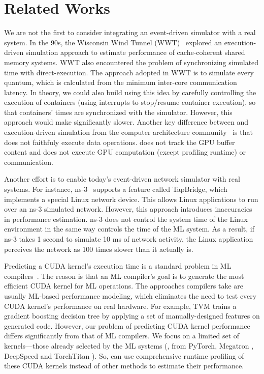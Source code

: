 \section{Related Works}

 We are not the first to consider integrating an event-driven simulator with a real system. In the 90s, the Wisconsin Wind Tunnel (WWT)~\cite{reinhardt1993wwt, mukherjee2000wwt} explored an execution-driven simulation approach to estimate performance of cache-coherent shared memory systems. WWT also encountered the problem of synchronizing simulated time with direct-execution. The approach adopted in WWT is to simulate every quantum, which is calculated from the minimum inter-core communication latency. In theory, we could also build \sys using this idea by carefully controlling the execution of containers (using interrupts to stop/resume container execution), so that containers' times are synchronized with the simulator. However, this approach would make \sys significantly slower. Another key difference between \sys and execution-driven simulation from the computer architecture community~\cite{martin2005gems} is that \sys does not faithfuly execute data operations. \sys does not track the GPU buffer content and does not execute GPU computation (except profiling runtime) or communication.

Another effort is to enable today's event-driven network simulator with real systems. For instance, ns-3~\cite{ns3} supports a feature called TapBridge, which implements a special Linux network device. This allows Linux applications to run over an ns-3 simulated network. However, this approach introduces inaccuracies in performance estimation. ns-3 does not control the system time of the Linux environment in the same way \sys controls the time of the ML system. As a result, if ns-3 takes 1 second to simulate 10 ms of network activity, the Linux application perceives the network as 100 times slower than it actually is. 

 Predicting a CUDA kernel's execution time is a standard problem in ML compilers~\cite{chen2018tvm, zheng2020ansor}. The reason is that an ML compiler's goal is to generate the most efficient CUDA kernel for ML operations.
The approaches compilers take are usually ML-based performance modeling, which eliminates the need to test every CUDA kernel's performance on real hardware. For example, TVM \cite{chen2018tvm} trains a gradient boosting decision tree by applying a set of manually-designed features on generated code. However, our problem of predicting CUDA kernel performance differs significantly from that of ML compilers. We focus on a limited set of kernels---those already selected by the ML systems (\eg, from PyTorch, Megatron \cite{shoeybi2019megatron}, DeepSpeed \cite{rasley2020deepspeed} and TorchTitan \cite{liang2025torchtitan}).
So, \sys can use comprehensive runtime profiling of these CUDA kernels instead of other methods to estimate their performance.



